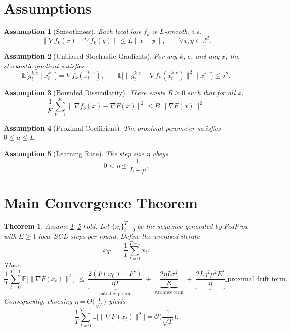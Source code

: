 \documentclass[11pt]{article}
\newtheorem{theorem}{Theorem}
\newtheorem{assumption}{Assumption}
\begin{document}
\newpage
\section*{Assumptions}
\begin{assumption}[Smoothness]\label{as:smooth}
Each local loss $f_k$ is $L$‑smooth, i.e.
\[
\|\nabla f_k(x)-\nabla f_k(y)\|\le L\|x-y\|,\qquad\forall x,y\in\mathbb{R}^d.
\]
\end{assumption}
\begin{assumption}[Unbiased Stochastic Gradients]\label{as:unbiased}
For any $k$, $e$, and any $x$, the stochastic gradient satisfies
\[
\mathbb{E}\big[g_{t}^{k,e}\mid x_{t}^{k,e}\big]=\nabla f_k(x_{t}^{k,e}),
\qquad
\mathbb{E}\big[\|g_{t}^{k,e}-\nabla f_k(x_{t}^{k,e})\|^2\mid x_{t}^{k,e}\big]\le\sigma^2 .
\]
\end{assumption}
\begin{assumption}[Bounded Dissimilarity]\label{as:dissimilarity}
There exists $B\ge0$ such that for all $x$,
\[
\frac1K\sum_{k=1}^K\|\nabla f_k(x)-\nabla F(x)\|^2\le B\,\|\nabla F(x)\|^2 .
\]
\end{assumption}
\begin{assumption}[Proximal Coefficient]\label{as:mu}
The proximal parameter satisfies $0\le\mu\le L$.
\end{assumption}
\begin{assumption}[Learning Rate]\label{as:eta}
The step size $\eta$ obeys
\[
0<\eta\le \frac{1}{L+\mu}.
\]
\end{assumption}

\section*{Main Convergence Theorem}
\begin{theorem}\label{thm:conv}
Assume \ref{as:smooth}--\ref{as:eta} hold. Let $\{x_t\}_{t=0}^{T}$ be the sequence generated by FedProx with $E\ge1$ local SGD steps per round. Define the averaged iterate
\[
\bar x_T\;=\;\frac1T\sum_{t=0}^{T-1}x_t .
\]
Then
\[
\frac1T\sum_{t=0}^{T-1}\mathbb{E}\big[\|\nabla F(x_t)\|^2\big]
\;\le\;
\underbrace{\frac{2(F(x_0)-F^\star)}{\eta T}}_{\text{initial gap term}}
\;+\;
\underbrace{ \frac{2\eta L\sigma^2}{K}}_{\text{variance term}}
\;+\;
\underbrace{ \frac{2L\eta^2\mu^2E^2}{\eta}}\_{\text{proximal drift term}} .
\]
Consequently, choosing $\eta = \Theta\!\big(\frac{1}{\sqrt{T}}\big)$ yields
\[
\frac1T\sum_{t=0}^{T-1}\mathbb{E}\big[\|\nabla F(x_t)\|^2\big]=\mathcal{O}\!\Big(\frac{1}{\sqrt{T}}\Big).
\]
\end{theorem}
\end{document}
